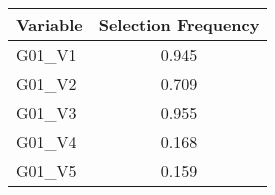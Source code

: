 

\begin{tabular}[t]{lc}
\toprule
Variable & Selection Frequency\\
\midrule
G01\_V1 & 0.945\\
G01\_V2 & 0.709\\
G01\_V3 & 0.955\\
G01\_V4 & 0.168\\
G01\_V5 & 0.159\\
\bottomrule
\end{tabular}


